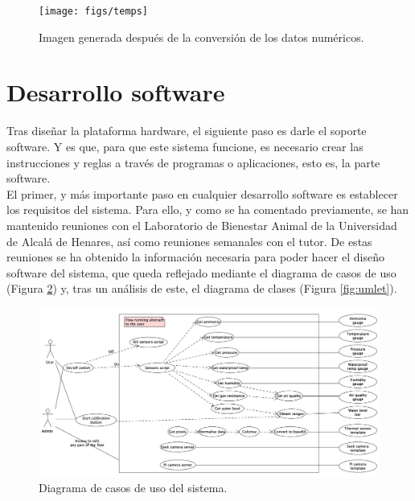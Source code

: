 \begin{figure} [h!]
  \begin{center}
    \texttt{[image: figs/temps]}
  \end{center}
  \caption{Imagen generada después de la conversión de los datos numéricos.}
  \label{fig:temps}
\end{figure}

\section{Desarrollo software}
\label{sec:dessw}
Tras diseñar la plataforma hardware, el siguiente paso es darle el soporte software. Y es que, para que este sistema funcione, es necesario crear las instrucciones y reglas a través de programas o aplicaciones, esto es, la parte software.\\

El primer, y más importante paso en cualquier desarrollo software es establecer los requisitos del sistema. Para ello, y como se ha comentado previamente, se han mantenido reuniones con el Laboratorio de Bienestar Animal de la Universidad de Alcalá de Henares, así como reuniones semanales con el tutor. De estas reuniones se ha obtenido la información necesaria para poder hacer el diseño software del sistema, que queda reflejado mediante el diagrama de casos de uso (Figura \ref{fig:casos}) y, tras un análisis de este, el diagrama de clases (Figura \ref{fig:umlet}).\\
\begin{figure} [h!]
  \begin{center}
    \includegraphics[width=17cm]{figs/casos}
  \end{center}
  \caption{Diagrama de casos de uso del sistema.}
  \label{fig:casos}
\end{figure}

